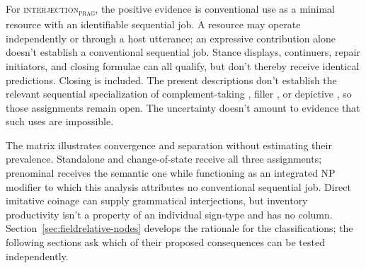 \documentclass[12pt]{article}
\newcommand{\intj}[1]{\textsc{interjection\textsubscript{#1}}}
\begin{document}
For \intj{prag}, the positive evidence is conventional use as a minimal resource with an identifiable sequential job. A resource may operate independently or through a host utterance; an expressive contribution alone doesn't establish a conventional sequential job. Stance displays, continuers, repair initiators, and closing formulae can all qualify, but don't thereby receive identical predictions. Closing  is included. The present descriptions don't establish the relevant sequential specialization of complement-taking , filler , or depictive , so those assignments remain open. The uncertainty doesn't amount to evidence that such uses are impossible.

The matrix illustrates convergence and separation without estimating their prevalence. Standalone  and change-of-state  receive all three assignments; prenominal  receives the semantic one while functioning as an integrated NP modifier to which this analysis attributes no conventional sequential job. Direct imitative coinage can supply grammatical interjections, but inventory productivity isn't a property of an individual sign-type and has no column. Section~\ref{sec:fieldrelative-nodes} develops the rationale for the classifications; the following sections ask which of their proposed consequences can be tested independently.
\end{document}
